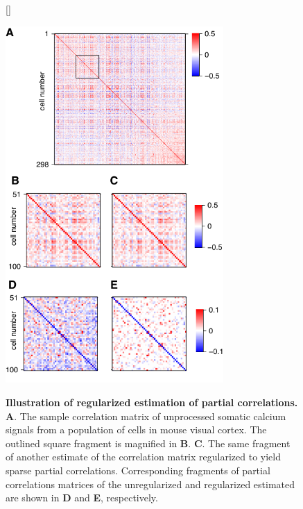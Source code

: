 \documentclass[10pt]{article}
\begin{document}
\begin{figure}[!ht]    [\FBwidth]
    {\caption{{\bf Illustration of regularized estimation of partial correlations.}
        {\bf A}. The sample correlation matrix of unprocessed somatic calcium signals from a population of cells in mouse visual cortex.
        The outlined square fragment is magnified in {\bf B}.
        {\bf C}. The same fragment of another estimate of the correlation matrix regularized to yield sparse partial correlations.
        Corresponding fragments of partial correlations matrices of the unregularized and regularized estimated are shown in {\bf D} and {\bf E}, respectively.
    }
    \label{fig:01}}
    {\includegraphics[width=8.3cm]{./figures/Figure01.pdf}}
\end{figure}
\end{document}
